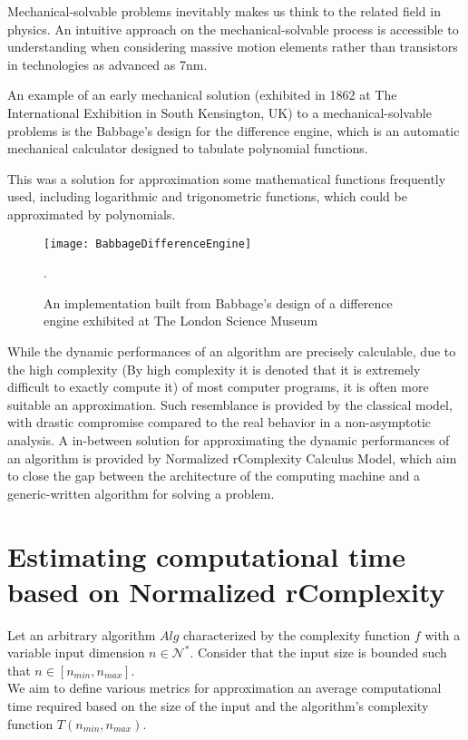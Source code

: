 \begin{remark}
Mechanical-solvable problems inevitably makes us think to the related field in physics. An intuitive approach on the mechanical-solvable process is accessible
 to understanding when considering massive motion elements rather than transistors in technologies as advanced as 7nm. 
 
An example of an early mechanical solution (exhibited in 1862 at The International Exhibition in South Kensington, UK) to a mechanical-solvable problems is the Babbage's design for the difference engine, which is an automatic mechanical calculator designed to tabulate polynomial functions. 

This was a solution for approximation some mathematical functions frequently used, including logarithmic and trigonometric functions, which could be approximated by polynomials.

\begin{figure}[H]
\centering
\texttt{[image: BabbageDifferenceEngine]}
\caption{An implementation built from Babbage's design of a difference engine exhibited at The London Science Museum}.
\end{figure}

\end{remark}

While the dynamic performances of an algorithm are precisely calculable, due to the high complexity (By high complexity it is denoted that it is extremely difficult to exactly compute it) of most computer programs, it is often more suitable an approximation. Such resemblance is provided by the classical model, with drastic compromise compared to the real behavior in a non-asymptotic analysis. A in-between solution for approximating the dynamic performances of an algorithm is provided by Normalized rComplexity Calculus Model, which aim to close the gap between the architecture of the computing machine and a generic-written algorithm for solving a problem.

\section{Estimating computational time based on Normalized rComplexity}
Let an arbitrary algorithm $Alg$ characterized by the complexity function $f$ with a variable input dimension $n \in \mathcal{N}^{*}$. Consider that the input size is bounded such that $n \in [n_{min}, n_{max}]$. \\
We aim to define various metrics for approximation an average computational time required based on the size of the input and the algorithm's complexity function  $T(n_{min}, n_{max})$.\\

